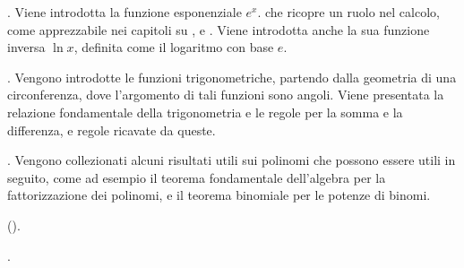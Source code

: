 \documentclass[letterpaper,10pt,italian]{jupyterBook}
\begin{document}
\sphinxAtStartPar
{\hyperref[\detokenize{ch/precalculus/exponential_logarithm:math-hs-exp-log}]{}} . Viene introdotta la funzione esponenziale \(e^x\). che ricopre un ruolo  nel calcolo, come apprezzabile nei capitoli su {\hyperref[\detokenize{ch/infinitesimal_calculus/derivatives:infinitesimal-calculus-derivatives}]{}}, {\hyperref[\detokenize{ch/infinitesimal_calculus/integrals:infinitesimal-calculus-integrals}]{}} e {\hyperref[\detokenize{ch/ode:ode-hs}]{}}.
Viene introdotta anche la sua funzione inversa \(\ln x\), definita come il logaritmo con base \(e\).

\sphinxAtStartPar
{\hyperref[\detokenize{ch/trigonometry:math-hs-trigonometry}]{}} . Vengono introdotte le funzioni trigonometriche, partendo dalla geometria di una circonferenza, dove l’argomento di tali funzioni sono angoli. Viene presentata la relazione fondamentale della trigonometria e le regole per la somma e la differenza, e regole ricavate da queste.

\sphinxAtStartPar
{\hyperref[\detokenize{ch/precalculus/polynomials:math-hs-precalculus-polynomials}]{}}     \sphinxstyleemphasis{)}. Vengono collezionati alcuni risultati utili sui polinomi che possono essere utili in seguito, come ad esempio il teorema fondamentale dell’algebra per la fattorizzazione dei polinomi, e il teorema binomiale per le potenze di binomi.

\sphinxAtStartPar
{\hyperref[\detokenize{ch/precalculus/multivariable-real-fun:math-hs-precalculus-multivariable-real-fun}]{}} (). 

\sphinxAtStartPar
{\hyperref[\detokenize{ch/algebra/complex-algebra:math-hs-algebra-complex}]{}}     \sphinxstyleemphasis{)}.
\end{document}
